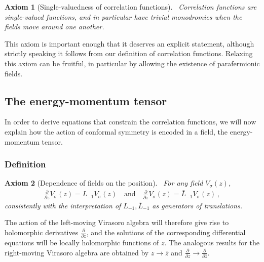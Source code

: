 \documentclass[12pt, a4paper, notitlepage, twoside]{report}
\numberwithin{equation}{section}
\theoremstyle{break}
\newtheorem{hyp}{Axiom}[chapter]
\begin{document}
\begin{hyp}[Single-valuedness of correlation functions]
 ~\label{ax:svcf}
 Correlation functions are single-valued functions, and in particular have trivial monodromies when the fields move around one another.
\end{hyp}
\noindent
This axiom is important enough that it deserves an explicit statement, although strictly speaking it follows from our definition of correlation functions.
Relaxing this axiom can be fruitful, in particular by allowing the existence of parafermionic fields.


\subsection{The energy-momentum tensor \label{secem}}

In order to derive equations that constrain the correlation functions, we will now explain how the action of conformal symmetry is encoded in a field, the energy-momentum tensor.

\subsubsection{Definition}

\begin{hyp}[Dependence of fields on the position]
 ~\label{ax:dvz}
 For any field $V_\sigma(z)$,
 \begin{align}
 \boxed{{\frac{\partial}{\partial z} V_\sigma(z)} = L_{-1} V_\sigma (z) }  \quad \text{and} \quad {\frac{\partial}{\partial \bar z} V_\sigma(z)} = \bar L_{-1} V_\sigma (z)\ ,
\label{lvpv}
\end{align}
consistently with the interpretation of $L_{-1},\bar L_{-1}$ as generators of translations. 
\end{hyp}
\noindent
The action of the left-moving Virasoro algebra will therefore give rise to holomorphic derivatives $\frac{\partial}{\partial z}$, and the solutions of the corresponding differential equations will be locally holomorphic functions of $z$. The analogous results for the right-moving Virasoro algebra are obtained by $z\to \bar z$ and $\frac{\partial}{\partial z} \to \frac{\partial}{\partial \bar z}$. 
\end{document}

